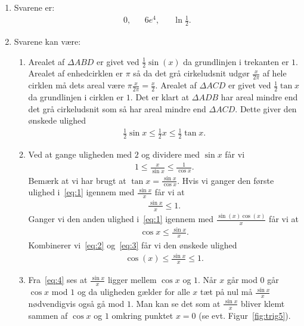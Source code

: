 \begin{enumerate}
	\item Svarene er:
	\begin{align*}
	0,&& 6e^4,&&  \ln \frac{1}{2}.
	\end{align*}
	
	\item\label{it:lim1ans} Svarene kan være:
	\begin{enumerate}
		\item Arealet af $\Delta ABD$ er givet ved $\frac{1}{2}\sin(x)$ da grundlinjen i trekanten er $1$. Arealet af enhedcirklen er $\pi$ så da det grå cirkeludsnit udgør $ \frac{x}{2\pi} $ af hele cirklen må dets areal være $ \pi\frac{x}{2\pi}=\frac{x}{2} $. Arealet af $\Delta ACD$ er givet ved $\frac{1}{2}\tan x$ da grundlinjen i cirklen er $1$. Det er klart at $\Delta ADB$ har areal mindre end det grå cirkeludsnit som så har areal mindre end $\Delta ACD$. Dette giver den ønskede ulighed
		\begin{align*}
		\frac{1}{2}\sin x\leq \frac{1}{2}x\leq \frac{1}{2}\tan x.
		\end{align*}
		
		\item Ved at gange uligheden med $2$ og dividere med $\sin x$ får vi
		\begin{align}\label{eq:1}
		1\leq \frac{x}{\sin x}\leq \frac{1}{\cos x}.
		\end{align}
		Bemærk at vi har brugt at $\tan x=\frac{\sin x}{\cos x}$. Hvis vi ganger den første ulighed i~\eqref{eq:1} igennem med $\frac{\sin x}{x}$ får vi at
		\begin{align}\label{eq:2}
		\frac{\sin x}{x}\leq 1.
		\end{align}
		Ganger vi den anden ulighed i~\eqref{eq:1} igennem med $\frac{\sin(x)\cos(x)}{x}$ får vi at 
		\begin{align}\label{eq:3}
		\cos x\leq \frac{\sin x}{x}.
		\end{align}
		Kombinerer vi~\eqref{eq:2} og~\eqref{eq:3} får vi den ønskede ulighed
		\begin{align}\label{eq:4}
		\cos(x)\leq \frac{\sin x}{x}\leq 1.
		\end{align}

		
		\item Fra~\eqref{eq:4} ses at $ \frac{\sin x}{x} $ ligger mellem $\cos x$ og $1$. Når $x$ går mod $0$ går $\cos x$ mod $1$ og da uligheden gælder for alle $x$ tæt på nul må $\frac{\sin x}{x}$ nødvendigvis også gå mod $1$. Man kan se det som at $\frac{\sin x}{x}$ bliver klemt sammen af $\cos x$ og $1$ omkring punktet $x=0$ (se evt. Figur~\ref{fig:trig5}).
	\end{enumerate}


\end{enumerate}
